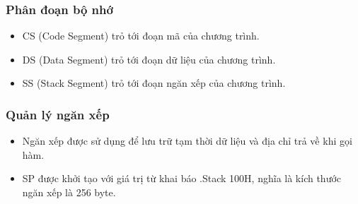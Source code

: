 \subsubsection{Phân đoạn bộ nhớ}
\begin{itemize}
    \item CS (Code Segment) trỏ tới đoạn mã của chương trình.
    \item DS (Data Segment) trỏ tới đoạn dữ liệu của chương trình.
    \item SS (Stack Segment) trỏ tới đoạn ngăn xếp của chương trình.
\end{itemize}

\subsubsection{Quản lý ngăn xếp}
\begin{itemize}
    \item Ngăn xếp được sử dụng để lưu trữ tạm thời dữ liệu và địa chỉ trả về khi gọi hàm.
    \item SP được khởi tạo với giá trị từ khai báo .Stack 100H, nghĩa là kích thước ngăn xếp là 256 byte.
\end{itemize}